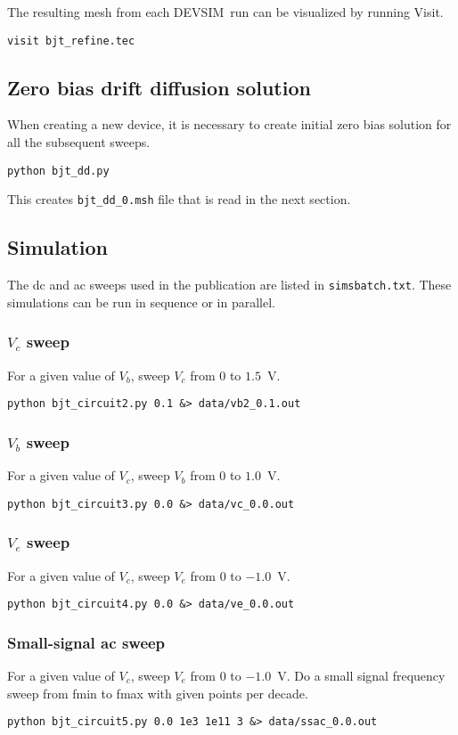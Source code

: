 \documentclass[11pt]{article}
\newcommand{\devsim}{\mbox{DEVSIM}}
\begin{document}
The resulting mesh from each \devsim\ run can be visualized by running Visit.
\begin{verbatim}
visit bjt_refine.tec
\end{verbatim}

\subsection{Zero bias drift diffusion solution}
When creating a new device, it is necessary to create initial zero bias solution for all the subsequent sweeps.
\begin{verbatim}
python bjt_dd.py
\end{verbatim}
This creates \texttt{bjt\_dd\_0.msh} file that is read in the next section.

\subsection{Simulation}
The dc and ac sweeps used in the publication are listed in \texttt{simsbatch.txt}.  These simulations can be run in sequence or in parallel.


\subsubsection{$V_c$ sweep}
For a given value of $V_b$, sweep $V_c$ from $0$ to $1.5$~V.
\begin{verbatim}
python bjt_circuit2.py 0.1 &> data/vb2_0.1.out
\end{verbatim}

\subsubsection{$V_b$ sweep}
For a given value of $V_c$, sweep $V_b$ from $0$ to $1.0$~V.
\begin{verbatim}
python bjt_circuit3.py 0.0 &> data/vc_0.0.out
\end{verbatim}

\subsubsection{$V_e$ sweep}
For a given value of $V_c$, sweep $V_e$ from $0$ to $-1.0$~V.
\begin{verbatim}
python bjt_circuit4.py 0.0 &> data/ve_0.0.out
\end{verbatim}

\subsubsection{Small-signal ac sweep}
For a given value of $V_c$, sweep $V_e$ from $0$ to $-1.0$~V.  Do a small signal frequency sweep from fmin to fmax with given points per decade.
\begin{verbatim}
python bjt_circuit5.py 0.0 1e3 1e11 3 &> data/ssac_0.0.out
\end{verbatim}
\end{document}
